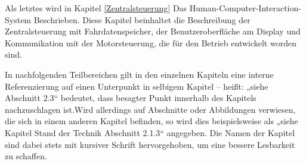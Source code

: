 Als letztes wird in Kapitel \ref{Zentralsteuerung} Das Human-Computer-Interaction-System Beschrieben. Diese Kapitel beinhaltet die Beschreibung der Zentralsteuerung mit Fahrdatenspeicher, der Benutzeroberfläche am Display und Kommunikation mit der Motorsteuerung, die für den Betrieb entwickelt worden sind.

In nachfolgenden Teilbereichen gilt in den einzelnen Kapiteln eine interne Referenzierung auf einen Unterpunkt in selbigem Kapitel – heißt: „siehe Abschnitt 2.3“ bedeutet, dass besagter Punkt innerhalb des Kapitels nachzuschlagen ist.Wird allerdings auf Abschnitte oder Abbildungen verwiesen, die sich in einem anderen Kapitel befinden, so wird dies beispielsweise als „siehe Kapitel Stand der Technik Abschnitt 2.1.3“ angegeben. Die Namen der Kapitel sind dabei stets mit kursiver Schrift hervorgehoben, um eine bessere Lesbarkeit zu schaffen.